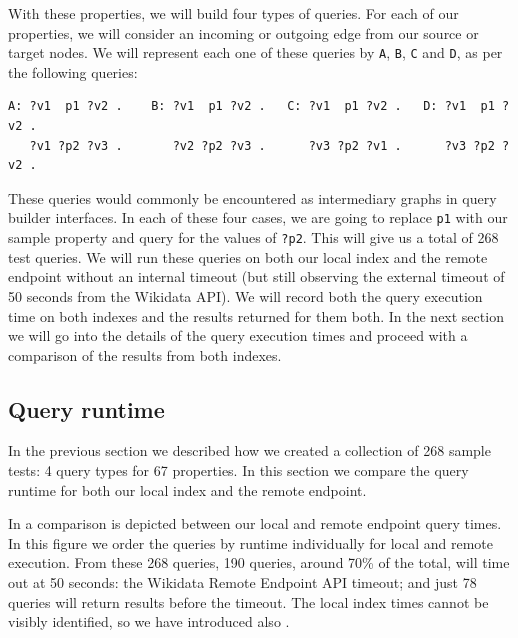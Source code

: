 With these properties, we will build four types of queries. For each of our properties, we will consider an incoming or outgoing edge from our source or target nodes. We will represent each one of these queries by \texttt{A}, \texttt{B}, \texttt{C} and \texttt{D}, as per the following queries: 

\begin{verbatim}
A: ?v1  p1 ?v2 .    B: ?v1  p1 ?v2 .   C: ?v1  p1 ?v2 .   D: ?v1  p1 ?v2 .
   ?v1 ?p2 ?v3 .       ?v2 ?p2 ?v3 .      ?v3 ?p2 ?v1 .      ?v3 ?p2 ?v2 .
\end{verbatim}

These queries would commonly be encountered as intermediary graphs in query builder interfaces. In each of these four cases, we are going to replace \texttt{p1} with our sample property and query for the values of \texttt{?p2}. This will give us a total of 268 test queries. We will run these queries on both our local index and the remote endpoint without an internal timeout (but still observing the external timeout of 50 seconds from the Wikidata API). We will record both the query execution time on both indexes and the results returned for them both. In the next section we will go into the details of the query execution times and proceed with a comparison of the results from both indexes.

\subsection{Query runtime}

In the previous section we described how we created a collection of 268 sample tests: 4 query types for 67 properties. In this section we compare the query runtime for both our local index and the remote endpoint.

In  a comparison is depicted between our local and remote endpoint query times. In this figure we order the queries by runtime individually for local and remote execution. From these 268 queries, 190 queries, around 70\% of the total, will time out at 50 seconds: the Wikidata Remote Endpoint API timeout; and just 78 queries will return results before the timeout. The local index times cannot be visibly identified, so we have introduced also .


